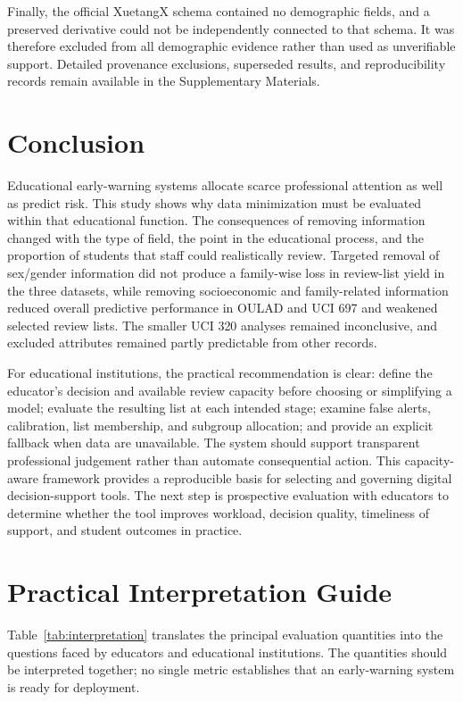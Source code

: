 \documentclass[education,article,submit,moreauthors]{Definitions/mdpi}
\begin{document}
Finally, the official XuetangX schema contained no demographic fields, and a preserved derivative could not be independently connected to that schema. It was therefore excluded from all demographic evidence rather than used as unverifiable support. Detailed provenance exclusions, superseded results, and reproducibility records remain available in the Supplementary Materials.

\section{Conclusion}

Educational early-warning systems allocate scarce professional attention as well as predict risk. This study shows why data minimization must be evaluated within that educational function. The consequences of removing information changed with the type of field, the point in the educational process, and the proportion of students that staff could realistically review. Targeted removal of sex/gender information did not produce a family-wise loss in review-list yield in the three datasets, while removing socioeconomic and family-related information reduced overall predictive performance in OULAD and UCI 697 and weakened selected review lists. The smaller UCI 320 analyses remained inconclusive, and excluded attributes remained partly predictable from other records.

For educational institutions, the practical recommendation is clear: define the educator's decision and available review capacity before choosing or simplifying a model; evaluate the resulting list at each intended stage; examine false alerts, calibration, list membership, and subgroup allocation; and provide an explicit fallback when data are unavailable. The system should support transparent professional judgement rather than automate consequential action. This capacity-aware framework provides a reproducible basis for selecting and governing digital decision-support tools. The next step is prospective evaluation with educators to determine whether the tool improves workload, decision quality, timeliness of support, and student outcomes in practice.

\appendixstart
\appendix

\section{Practical Interpretation Guide}

Table~\ref{tab:interpretation} translates the principal evaluation quantities into the questions faced by educators and educational institutions. The quantities should be interpreted together; no single metric establishes that an early-warning system is ready for deployment.
\end{document}
